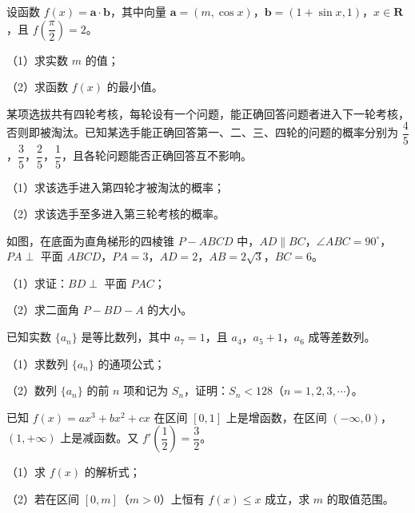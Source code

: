\begin{question}
设函数 $f(x)=\boldsymbol a\cdot\boldsymbol b$，其中向量 $\boldsymbol a=(m,\cos x)$，$\boldsymbol b=(1+\sin x,1)$，$x\in\mathbf R$，且 $f\left(\dfrac{\pi}{2}\right)=2$。

（1）求实数 $m$ 的值；

（2）求函数 $f(x)$ 的最小值。

\end{question}
\begin{question}
某项选拔共有四轮考核，每轮设有一个问题，能正确回答问题者进入下一轮考核，否则即被淘汰。已知某选手能正确回答第一、二、三、四轮的问题的概率分别为 $\dfrac45$，$\dfrac35$，$\dfrac25$，$\dfrac15$，且各轮问题能否正确回答互不影响。

（1）求该选手进入第四轮才被淘汰的概率；

（2）求该选手至多进入第三轮考核的概率。

\Needspace{0.4\textheight}
\end{question}
\begin{question}
如图，在底面为直角梯形的四棱锥 $P-ABCD$ 中，$AD\parallel BC$，$\angle ABC=90^\circ$，$PA\perp$ 平面 $ABCD$，$PA=3$，$AD=2$，$AB=2\sqrt3$，$BC=6$。

（1）求证：$BD\perp$ 平面 $PAC$；

（2）求二面角 $P-BD-A$ 的大小。
\nopagebreak[4]
\begin{center}\end{center}
\nopagebreak[4]
\end{question}
\begin{question}
已知实数 $\{a_n\}$ 是等比数列，其中 $a_7=1$，且 $a_4$，$a_5+1$，$a_6$ 成等差数列。

（1）求数列 $\{a_n\}$ 的通项公式；

（2）数列 $\{a_n\}$ 的前 $n$ 项和记为 $S_n$，证明：$S_n<128$（$n=1,2,3,\cdots$）。

\end{question}
\begin{question}
已知 $f(x)=ax^3+bx^2+cx$ 在区间 $[0,1]$ 上是增函数，在区间 $(-\infty,0)$，$(1,+\infty)$ 上是减函数。又 $f'\left(\dfrac12\right)=\dfrac32$。

（1）求 $f(x)$ 的解析式；

（2）若在区间 $[0,m]$（$m>0$）上恒有 $f(x)\leqslant x$ 成立，求 $m$ 的取值范围。

\end{question}